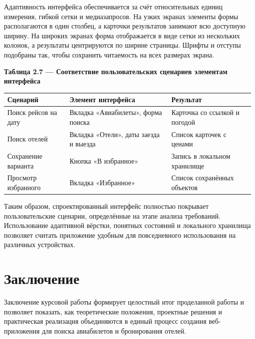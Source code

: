 \documentclass[14pt,a4paper,oneside]{extreport}
\begin{document}
Адаптивность интерфейса обеспечивается за счёт относительных единиц измерения, гибкой сетки и медиазапросов. На узких экранах элементы формы располагаются в один столбец, а карточки результатов занимают всю доступную ширину. На широких экранах форма отображается в виде сетки из нескольких колонок, а результаты центрируются по ширине страницы. Шрифты и отступы подобраны так, чтобы сохранить читаемость на всех размерах экрана.

\begin{table}[htbp]\centering

\textbf{Таблица 2.7 — Соответствие пользовательских сценариев элементам интерфейса}\par\vspace{4pt}

\begin{center}
\small
\begin{tabularx}{\textwidth}{|X|X|X|}
\hline
Сценарий & Элемент интерфейса & Результат \\
\hline
Поиск рейсов на дату & Вкладка «Авиабилеты», форма поиска & Карточка со ссылкой и погодой \\
\hline
Поиск отелей & Вкладка «Отели», даты заезда и выезда & Список карточек с ценами \\
\hline
Сохранение варианта & Кнопка «В избранное» & Запись в локальном хранилище \\
\hline
Просмотр избранного & Вкладка «Избранное» & Список сохранённых объектов \\
\hline
\end{tabularx}
\end{center}

\end{table}

Таким образом, спроектированный интерфейс полностью покрывает пользовательские сценарии, определённые на этапе анализа требований. Использование адаптивной вёрстки, понятных состояний и локального хранилища позволяет считать приложение удобным для повседневного использования на различных устройствах.


\chapter*{Заключение}

Заключение курсовой работы формирует целостный итог проделанной работы и позволяет показать, как теоретические положения, проектные решения и практическая реализация объединяются в единый процесс создания веб-приложения для поиска авиабилетов и бронирования отелей.
\end{document}
